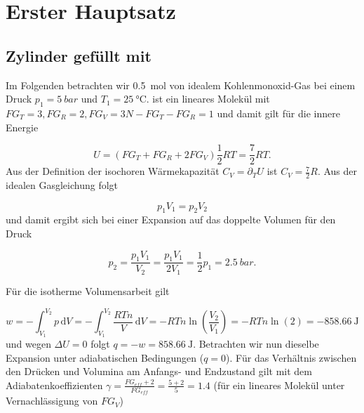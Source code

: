 \section{Erster Hauptsatz}

  \subsection{Zylinder gefüllt mit }
    
      Im Folgenden betrachten wir \SI[mode=text]{0.5}{\mole} von idealem Kohlenmonoxid-Gas bei einem Druck $p_1 = \SI[mode=text]{5}{bar}$ und $T_1 = \SI[mode=text]{25}{\degreeCelsius}$.  ist ein lineares Molekül mit $FG_T = 3, FG_R = 2, FG_V = 3N - FG_T - FG_R = 1$ und damit gilt für die innere Energie
    
        \begin{equation}
          U = (FG_T + FG_R + 2 FG_V)\frac{1}{2} RT = \frac{7}{2} RT.
        \end{equation}
      Aus der Definition der isochoren Wärmekapazität $C_V = \partial_T U$ ist $C_V = \frac{7}{2} R$. Aus der idealen Gasgleichung folgt 
      
        \begin{equation}
          p_1 V_1 = p_2 V_2
        \end{equation}
      und damit ergibt sich bei einer Expansion auf das doppelte Volumen für den Druck
      
        \begin{equation}
          p_2 = \frac{p_1 V_1}{V_2} = \frac{p_1 V_1}{2 V_1} = \frac{1}{2} p_1 = \SI[mode=text]{2.5}{bar}.
        \end{equation}
      
      Für die isotherme Volumensarbeit gilt
      
        \begin{equation}
          w = - \int_{V_1}^{V_2} p \, \text{d} V = - \int_{V_1}^{V_2} \frac{RTn}{V} \, \text{d} V = - RTn \ln\left(\frac{V_2}{V_1}\right) = - RTn \ln(2) = \SI[mode=text]{-858.66}{\joule}
        \end{equation}
      und wegen $\Delta U = 0$ folgt $q = -w = \SI[mode=text]{+858.66}{\joule}$. Betrachten wir nun dieselbe Expansion unter adiabatischen Bedingungen ($q = 0$). Für das Verhältnis zwischen den Drücken und Volumina am Anfangs- und Endzustand gilt mit dem Adiabatenkoeffizienten $\gamma = \frac{FG_{eff} + 2}{FG_{eff}} = \frac{5 + 2}{5} = 1.4$ (für ein lineares Molekül unter Vernachlässigung von $FG_V$)
      
